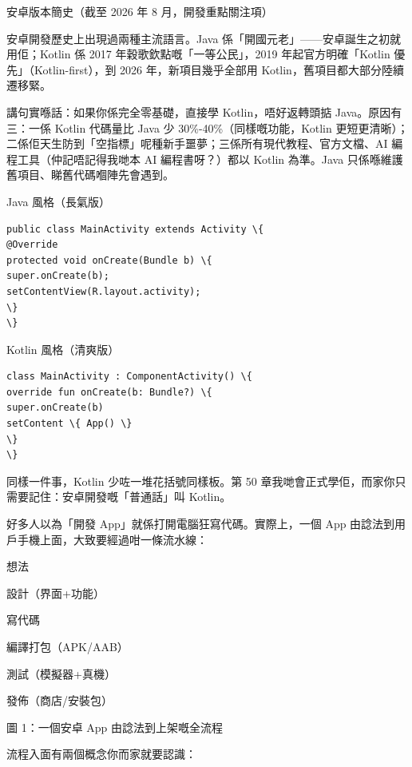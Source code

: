 \begin{center}\small\color{gray}安卓版本簡史（截至 2026 年 8 月，開發重點關注項）\end{center}


安卓開發歷史上出現過兩種主流語言。Java 係「開國元老」——安卓誕生之初就用佢；Kotlin 係 2017 年穀歌欽點嘅「一等公民」，2019 年起官方明確「Kotlin 優先」（Kotlin-first），到 2026 年，新項目幾乎全部用 Kotlin，舊項目都大部分陸續遷移緊。

講句實喺話：如果你係完全零基礎，直接學 Kotlin，唔好返轉頭掂 Java。原因有三：一係 Kotlin 代碼量比 Java 少 30\%-40\%（同樣嘅功能，Kotlin 更短更清晰）；二係佢天生防到「空指標」呢種新手噩夢；三係所有現代教程、官方文檔、AI 編程工具（仲記唔記得我哋本 AI 編程書呀？）都以 Kotlin 為準。Java 只係喺維護舊項目、睇舊代碼嗰陣先會遇到。

Java 風格（長氣版）

\begin{lstlisting}
public class MainActivity extends Activity \{
@Override
protected void onCreate(Bundle b) \{
super.onCreate(b);
setContentView(R.layout.activity);
\}
\}
\end{lstlisting}

Kotlin 風格（清爽版）

\begin{lstlisting}
class MainActivity : ComponentActivity() \{
override fun onCreate(b: Bundle?) \{
super.onCreate(b)
setContent \{ App() \}
\}
\}
\end{lstlisting}

同樣一件事，Kotlin 少咗一堆花括號同樣板。第 50 章我哋會正式學佢，而家你只需要記住：安卓開發嘅「普通話」叫 Kotlin。


好多人以為「開發 App」就係打開電腦狂寫代碼。實際上，一個 App 由諗法到用戶手機上面，大致要經過咁一條流水線：

想法

設計（界面+功能）

寫代碼

編譯打包（APK/AAB）

測試（模擬器+真機）

發佈（商店/安裝包）

\begin{center}\small\color{gray}圖 1：一個安卓 App 由諗法到上架嘅全流程\end{center}

流程入面有兩個概念你而家就要認識：

